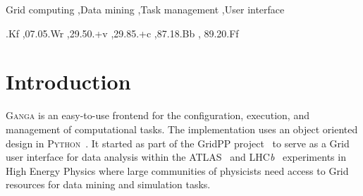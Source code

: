 \documentclass{elsart}
\def\lhcb {LHC{\em b\/}\xspace}
\def\atlas {ATLAS\xspace}
\def\ganga {\textsc{Ganga}\xspace}
\def\python {\textsc{Python}\xspace}
\def\grid {Grid\xspace}
\begin{document}
\begin{frontmatter}
\begin{abstract}
  We present the computational task-management tool \ganga which allows for
  the specification, submission, bookkeeping and post processing of
  computational tasks on a wide set of distributed resources.  \ganga
  effectively provides a homogeneous environment for processing data on
  heterogeneous resources. We provide examples from High Energy Physics,
  demonstrating how an analysis can be developed on a local system and then
  transparently moved to a \grid system for processing of all available data.
  \ganga offers an API which can be used via an interactive interface, in
  scripts, or through a GUI. Specific knowledge about types of tasks or
  computational resources is provided at run-time through a plug-in system, 
  making new developments easy to integrate. We give an overview of the
  \ganga architecture, give examples of current use, and demonstrate how
  \ganga can be used in many different areas of science.
\end{abstract}

\begin{keyword}
Grid computing \sep Data mining \sep Task management \sep User interface





  .Kf \sep 07.05.Wr \sep 29.50.+v \sep 29.85.+c \sep 87.18.Bb \sep
  89.20.Ff
\end{keyword}
\end{frontmatter}


\section{Introduction}
\label{sec:intro}
\ganga is an easy-to-use frontend for the configuration, execution, and
management of computational tasks. The implementation uses an object oriented
design in \python~\cite{python}. It started as part of the GridPP
project~\cite{Faulkner:2006px} to serve as a \grid user interface for data
analysis within the \atlas~\cite{ATLAS} and
\lhcb~\cite{LHCb} experiments in High Energy Physics where large
communities of physicists need access to \grid resources for data mining
and simulation tasks.
\end{document}
